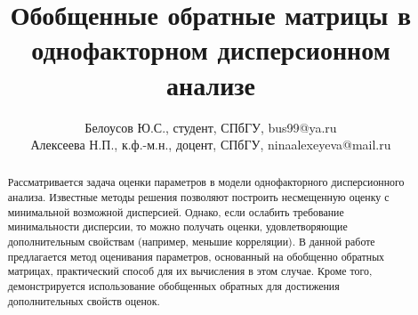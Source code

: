 \documentclass{spisok-article}
\title{Обобщенные обратные матрицы в однофакторном дисперсионном анализе}
\author{Белоусов Ю.С., студент, СПбГУ, bus99@ya.ru\\
Алексеева Н.П., к.ф.-м.н., доцент, СПбГУ, ninaalexeyeva@mail.ru}
\theoremstyle{definition}
\begin{document}
\maketitle

\begin{abstract}
Рассматривается задача оценки параметров в модели однофакторного дисперсионного анализа. Известные методы решения позволяют построить несмещенную оценку с минимальной возможной дисперсией. Однако, если ослабить требование минимальности дисперсии, то можно получать оценки, удовлетворяющие дополнительным свойствам (например, меньшие корреляции). В данной работе предлагается метод оценивания параметров, основанный на обобщенно обратных матрицах, практический способ для их вычисления в этом случае. Кроме того, демонстрируется использование обобщенных обратных для достижения дополнительных свойств оценок.
\end{abstract}
\end{document}
